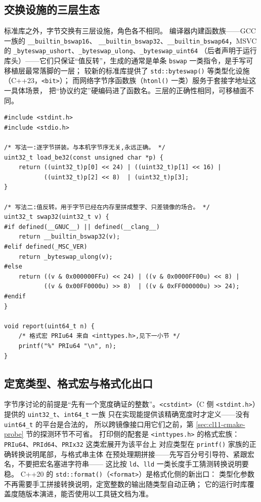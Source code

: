 \documentclass[12pt,a4paper,fontset=fandol]{ctexbook}
\newcommand{\cpp}[1]{C++#1}
\newcommand{\Fn}[1]{\texttt{#1()}}
\newcommand{\Tp}[1]{\texttt{#1}}
\newcommand{\Lang}[1]{\textsf{#1}}
\newcommand{\CL}{\Lang{C}}
\begin{document}
\subsection{交换设施的三层生态}\label{sec:cl12-swap-layers}

标准库之外，字节交换有三层设施，角色各不相同。
编译器内建函数族——GCC 一族的 \Tp{\_\_builtin\_bswap16}、
\Tp{\_\_builtin\_bswap32}、\Tp{\_\_builtin\_bswap64}，MSVC 的
\Tp{\_byteswap\_ushort}、\Tp{\_byteswap\_ulong}、\Tp{\_byteswap\_uint64}
（后者声明于运行库头）——它们只保证“值反转”，生成的通常是单条
\Tp{bswap} 一类指令，是手写可移植层最常落脚的一层；
较新的标准库提供了 \Fn{std::byteswap} 等类型化设施（\cpp{23}，\Tp{<bit>}）；
而网络字节序函数族（\Fn{htonl} 一类）服务于套接字地址这一具体场景，
把“协议约定”硬编码进了函数名。三层的正确性相同，可移植面不同。

\begin{lstlisting}[style=cstyle, caption={逐字节拼装与分宽度交换：两种都正确的写法}]
#include <stdint.h>
#include <stdio.h>

/* 写法一:逐字节拼装。与本机字节序无关,永远正确。 */
uint32_t load_be32(const unsigned char *p) {
    return ((uint32_t)p[0] << 24) | ((uint32_t)p[1] << 16) |
           ((uint32_t)p[2] << 8)  | (uint32_t)p[3];
}

/* 写法二:值反转。用于字节已经在内存里拼成整字、只差镜像的场合。 */
uint32_t swap32(uint32_t v) {
#if defined(__GNUC__) || defined(__clang__)
    return __builtin_bswap32(v);
#elif defined(_MSC_VER)
    return _byteswap_ulong(v);
#else
    return ((v & 0x000000FFu) << 24) | ((v & 0x0000FF00u) << 8) |
           ((v & 0x00FF0000u) >> 8)  | ((v & 0xFF000000u) >> 24);
#endif
}

void report(uint64_t n) {
    /* 格式宏 PRIu64 来自 <inttypes.h>,见下一小节 */
    printf("%" PRIu64 "\n", n);
}
\end{lstlisting}

\subsection{定宽类型、格式宏与格式化出口}\label{sec:cl12-cstdint}

字节序讨论的前提是“先有一个宽度确证的整数”。\Tp{<cstdint>}（\CL{} 侧
\Tp{<stdint.h>}）提供的 \Tp{uint32\_t}、\Tp{int64\_t} 一族
只在实现能提供该精确宽度时才定义——没有 \Tp{uint64\_t} 的平台是合法的，
所以跨镜像接口用它们之前，第 \ref{sec:cl11-cmake-probe} 节的探测环节不可省。
打印侧的配套是 \Tp{<inttypes.h>} 的格式宏族：
\Tp{PRIu64}、\Tp{PRId64}、\Tp{PRIx32} 这类宏展开为该平台上
对应类型在 \Fn{printf} 家族的正确转换说明尾部，与格式串主体
在预处理期拼接——先写百分号引导符、紧跟宏名，不要把宏名塞进字符串——
这比按 \Tp{ld}、\Tp{lld} 一类长度手工猜测转换说明要稳。
\cpp{20} 的 \Fn{std::format}（\Tp{<format>}）是格式化侧的新出口：
类型化参数不再需要手工拼接转换说明，定宽整数的输出随类型自动正确；
它的运行时库覆盖度随版本演进，能否使用以工具链文档为准。
\end{document}
